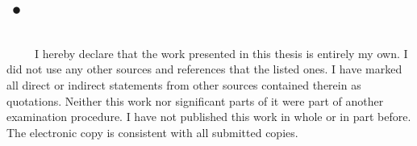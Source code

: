 \chapter*{•}

\section{}
\
\
\
\
\
I hereby declare that the work presented in this thesis is entirely my own.
I did not use any other sources and references that the listed ones. I have marked all direct or indirect
statements from other sources contained therein as quotations.
Neither this work nor significant parts of it were part of another examination procedure. I have not published
this work in whole or in part before.
The electronic copy is consistent with all submitted copies.

